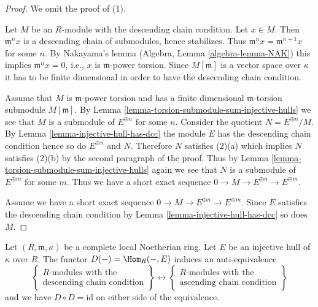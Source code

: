 \begin{proof}
We omit the proof of (1).

\medskip\noindent
Let $M$ be an $R$-module with the descending chain condition. Let $x \in M$.
Then $\mathfrak m^n x$ is a descending chain of submodules, hence stabilizes.
Thus $\mathfrak m^nx = \mathfrak m^{n + 1}x$ for some $n$. By Nakayama's lemma
(Algebra, Lemma \ref{algebra-lemma-NAK}) this implies $\mathfrak m^n x = 0$,
i.e., $x$ is $\mathfrak m$-power torsion. Since $M[\mathfrak m]$ is a vector
space over $\kappa$ it has to be finite dimensional in order to have the
descending chain condition.

\medskip\noindent
Assume that $M$ is $\mathfrak m$-power torsion and has a finite dimensional
$\mathfrak m$-torsion submodule $M[\mathfrak m]$. By
Lemma \ref{lemma-torsion-submodule-sum-injective-hulls}
we see that $M$ is a submodule of $E^{\oplus n}$ for some $n$.
Consider the quotient $N = E^{\oplus n}/M$. By
Lemma \ref{lemma-injective-hull-has-dcc} the module $E$ has the
descending chain condition hence so do $E^{\oplus n}$ and $N$.
Therefore $N$ satisfies (2)(a) which implies $N$ satisfies
(2)(b) by the second paragraph of the proof. Thus by
Lemma \ref{lemma-torsion-submodule-sum-injective-hulls}
again we see that $N$ is a submodule of $E^{\oplus m}$ for some $m$.
Thus we have a short exact sequence
$0 \to M \to E^{\oplus n} \to E^{\oplus m}$.

\medskip\noindent
Assume we have a short exact sequence
$0 \to M \to E^{\oplus n} \to E^{\oplus m}$.
Since $E$ satisfies the descending chain condition by
Lemma \ref{lemma-injective-hull-has-dcc}
so does $M$.
\end{proof}

\begin{proposition}
\label{proposition-matlis}
Let $(R, \mathfrak m, \kappa)$ be a complete local Noetherian ring.
Let $E$ be an injective hull of $\kappa$ over $R$. The functor
$D(-) = \Hom_R(-, E)$ induces an anti-equivalence
$$
\left\{
\begin{matrix}
R\text{-modules with the} \\
\text{descending chain condition}
\end{matrix}
\right\}
\longleftrightarrow
\left\{
\begin{matrix}
R\text{-modules with the} \\
\text{ascending chain condition}
\end{matrix}
\right\}
$$
and we have $D \circ D = \text{id}$ on either side of the equivalence.
\end{proposition}


